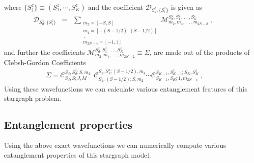 \documentclass[reprint,prb,superscriptaddress]{revtex4-1}
\begin{document}
where $\{S_i^z\}\equiv(S_1^z,\cdots,S_K^z)$ and the coefficient $\mathcal{D}_{S_d^z,\{S_i^z\}}$ is given as 
\begin{eqnarray}
\mathcal{D}_{S_d^z,\{S_i^z\}}  &=& \displaystyle\sum_{\substack{m_2=[-S,S]\\ m_4=[-(S-1/2),(S-1/2)]\\~.~\\  m_{2N-4}=[-1,1]   }} \mathcal{M}^{S_d^z,S_1^z,~.~.~ ,S_K^z}_{m_2,m_4,~.~.~ ,m_{2N-2}}~,~~~~~~
\end{eqnarray}
and further the coefficients $\mathcal{M}^{S_d^z,S_1^z,~.~.~ ,S_K^z}_{m_2,m_4,~.~.~, m_{2N-2}} \equiv\Sigma$, are made out of the products of Clebsh-Gordon Coefficients
\begin{eqnarray}
\Sigma=\mathcal{C}^{S_d,S_d^z;S,m_2}_{S_d,S;J,M} ~~ \mathcal{C}^{S_1,S_1^z;(S-1/2),m_4}_{S_1,(S-1/2);S,m_2} \cdots  \mathcal{C}^{S_{K-1},S_{K-1}^z;S_K,S_K^z}_{S_{K-1},S_{K};1,m_{2N-4}}~,~~~~
\end{eqnarray}
Using these wavefunctions we can calculate various entanglement features of this stargraph problem.


\subsection{Entanglement properties}
\noindent Using the above exact wavefunctions we can numerically compute various entanglement properties of this stargraph model. 
\end{document}
